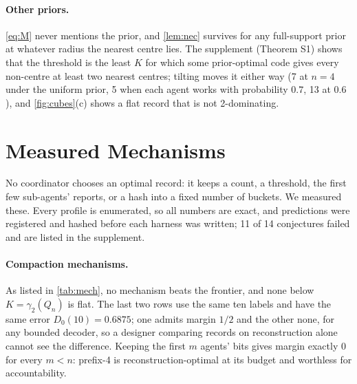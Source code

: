 \documentclass[sigconf,anonymous,acmthm=false]{acmart}
\theoremstyle{acmplain}
\theoremstyle{acmdefinition}
\begin{document}
\paragraph{Other priors.} \eqref{eq:M} never mentions the prior, and \cref{lem:nec} survives
for any full-support prior at whatever radius the nearest centre lies. The supplement
(Theorem S1) shows that the threshold is the least $K$ for which some prior-optimal code gives
every non-centre at least two nearest centres; tilting moves it either way (7 at $n=4$ under
the uniform prior, 5 when each agent works with probability $0.7$, 13 at $0.6$), and
\cref{fig:cubes}(c) shows a flat record that is not 2-dominating.

\section{Measured Mechanisms}\label{sec:experiments}

No coordinator chooses an optimal record: it keeps a count, a threshold, the first few
sub-agents' reports, or a hash into a fixed number of buckets. We measured these. Every profile
is enumerated, so all numbers are exact, and predictions were registered and hashed before
each harness was written; 11 of 14 conjectures failed and are listed in the supplement.

\paragraph{Compaction mechanisms.} As listed in \cref{tab:mech}, no mechanism beats the
frontier, and none below $K=\gamma_2(Q_n)$ is flat. The last two rows use the same ten labels
and have the same error $D_0(10)=0.6875$; one admits margin $1/2$ and the other none, for any
bounded decoder, so a designer comparing records on reconstruction alone cannot see the
difference. Keeping the first $m$ agents' bits gives margin exactly 0 for every $m<n$: prefix-4
is reconstruction-optimal at its budget and worthless for accountability.
\end{document}
